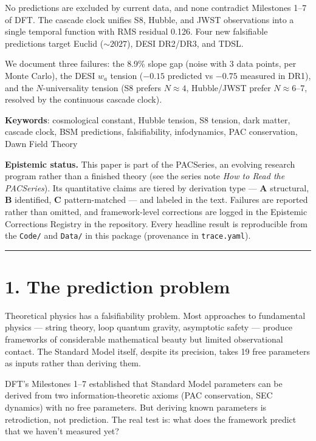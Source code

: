 \documentclass[11pt,a4paper]{article}
\begin{document}
No predictions are excluded by current data, and none contradict Milestones 1–7 of DFT. The cascade clock unifies S8, Hubble, and JWST observations into a single temporal function with RMS residual 0.126. Four new falsifiable predictions target Euclid ($\sim 2027$), DESI DR2/DR3, and TDSL.

We document three failures: the 8.9\% slope gap (noise with 3 data points, per Monte Carlo), the DESI $w_a$ tension ($-0.15$ predicted vs $-0.75$ measured in DR1), and the $N$-universality tension (S8 prefers $N \approx 4$, Hubble/JWST prefer $N \approx 6$–7, resolved by the continuous cascade clock).

\textbf{Keywords}: cosmological constant, Hubble tension, S8 tension, dark matter, cascade clock, BSM predictions, falsifiability, infodynamics, PAC conservation, Dawn Field Theory

\textbf{Epistemic status.} This paper is part of the PACSeries, an evolving research program rather than a finished theory (see the series note \emph{How to Read the PACSeries}). Its quantitative claims are tiered by derivation type — \textbf{A} structural, \textbf{B} identified, \textbf{C} pattern-matched — and labeled in the text. Failures are reported rather than omitted, and framework-level corrections are logged in the Epistemic Corrections Registry in the repository. Every headline result is reproducible from the \texttt{Code/} and \texttt{Data/} in this package (provenance in \texttt{trace.yaml}).

\begin{center}\rule{0.5\linewidth}{0.4pt}\end{center}

\section*{1. The prediction problem}

Theoretical physics has a falsifiability problem. Most approaches to fundamental physics — string theory, loop quantum gravity, asymptotic safety — produce frameworks of considerable mathematical beauty but limited observational contact. The Standard Model itself, despite its precision, takes 19 free parameters as inputs rather than deriving them.

DFT's Milestones 1–7 established that Standard Model parameters can be derived from two information-theoretic axioms (PAC conservation, SEC dynamics) with no free parameters. But deriving known parameters is retrodiction, not prediction. The real test is: what does the framework predict that we haven't measured yet?
\end{document}
